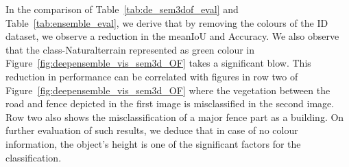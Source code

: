     \begin{table}[h!]
        \caption{Illustration of performance of RandLA-Net on Semantic3D without colour over number of ensembles. meanIOU, IOU per-class and overall accuracy are represented here.
        C1 to C8 are the classes of Semantic3D which are Manmadeterrain, Naturalterrain, Highvegetation, Lowvegetation, Buildings, Hardscapes, Scanningartifacts, and Cars.}
        \label{tab:de_sem3dof_eval}
    \end{table}
    In the comparison of Table~\ref{tab:de_sem3dof_eval} and Table~\ref{tab:ensemble_eval}, we derive that by removing the colours of the ID dataset, we observe a reduction in the meanIoU and Accuracy.
    We also observe that the class-Naturalterrain represented as green colour in Figure~\ref{fig:deepensemble_vis_sem3d_OF} takes a significant blow.
    This reduction in performance can be correlated with figures in row two of Figure~\ref{fig:deepensemble_vis_sem3d_OF} where the vegetation between the road and fence depicted in the first image is misclassified in the second image.
    Row two also shows the misclassification of a major fence part as a building.
    On further evaluation of such results, we deduce that in case of no colour information, the object's height is one of the significant factors for the classification.
